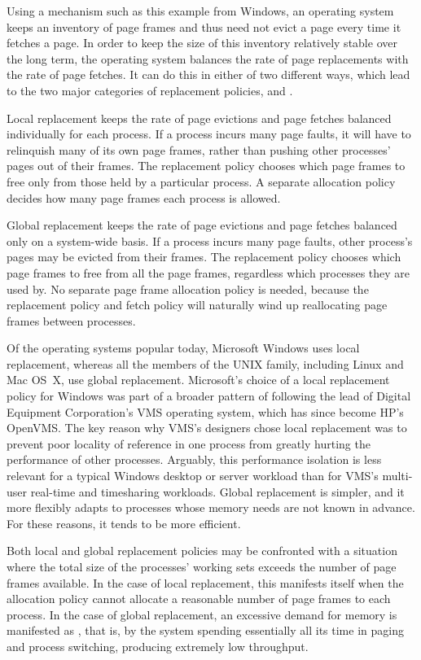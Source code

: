 Using a mechanism such as this example from Windows, an operating system keeps an
inventory of page frames and thus need not evict a page every time it
fetches a page.  In order to keep the size of this inventory
relatively stable over the long term, the operating system balances
the rate of page replacements with the rate of page fetches.  It can
do this in either of two different ways, which lead to the two major
categories of replacement policies,  and
.

Local replacement keeps the rate of page evictions and page fetches
balanced individually for each process.  If a process incurs many page
faults, it will have to relinquish many of its own page frames, rather
than pushing other processes' pages out of their frames.  The
replacement policy chooses which page frames to free only from those
held by a particular process.  A separate allocation policy decides how
many page frames each process is allowed.

Global replacement keeps the rate of page evictions and page fetches
balanced only on a system-wide basis.  If a process incurs many page
faults, other process's pages may be evicted from their frames.  The
replacement policy chooses which page frames to free from all the page
frames, regardless which processes they are used by.  No separate page
frame allocation policy is needed, because the replacement policy and
fetch policy will naturally wind up reallocating page frames between
processes.

Of the operating systems popular today, Microsoft Windows uses local
replacement, whereas all the members of the UNIX family, including
Linux and Mac OS~X, use global replacement.  Microsoft's choice of a
local replacement policy for Windows was part of a broader pattern of
following the lead of Digital Equipment Corporation's VMS operating
system, which has since become HP's OpenVMS.  The key reason why VMS's
designers chose local replacement was to prevent poor locality of
reference in one process from greatly hurting the performance of other
processes.  Arguably, this performance isolation is less relevant for
a typical Windows desktop or server workload than for VMS's multi-user
real-time and timesharing workloads.  Global replacement is simpler,
and it more flexibly adapts to processes whose memory needs
are not known in advance.  For these reasons, it tends to be more
efficient.

Both local and global replacement policies may be confronted with a
situation where the total size of the
processes' working sets exceeds the
number of page frames available.  In the case of local replacement,
this manifests itself when the allocation policy cannot allocate a
reasonable number of page frames to each process.  In the case
of global replacement, an excessive demand for memory is manifested as
, that is, by the system spending essentially all its time
in paging and process switching, producing extremely low throughput.

